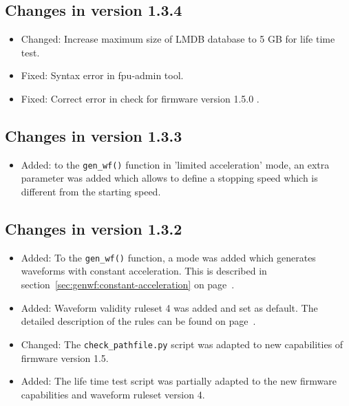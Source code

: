 \documentclass[11pt,a4paper]{report}
\begin{document}
\subsection*{Changes in version 1.3.4}
\begin{itemize}
\item Changed: Increase maximum size of LMDB database to 5 GB for life time test.
\item Fixed: Syntax error in fpu-admin tool.
\item Fixed: Correct error in check for firmware version 1.5.0 .
\end{itemize}


\subsection*{Changes in version 1.3.3}
\begin{itemize}
\item Added: to the \texttt{gen\_wf()} function in 'limited
  acceleration' mode, an extra parameter was added which allows to
  define a stopping speed which is different from the starting speed.
\end{itemize}

\subsection*{Changes in version 1.3.2}
\begin{itemize}
\item Added: To the \texttt{gen\_wf()} function, a mode
  was added which generates waveforms with constant acceleration.
  This is described in section~\ref{sec:genwf:constant-acceleration}
  on page~\pageref{sec:genwf:constant-acceleration}.

\item Added: Waveform validity ruleset 4 was added and set as default.
  The detailed description of the rules can be found on
  page~\pageref{sec:wfrulesetv4}.

\item Changed: The \texttt{check\_pathfile.py} script was adapted to
  new capabilities of firmware version 1.5.

\item Added: The life time test script was partially adapted to the
  new firmware capabilities and waveform ruleset version 4.
  
\end{itemize}
\end{document}
